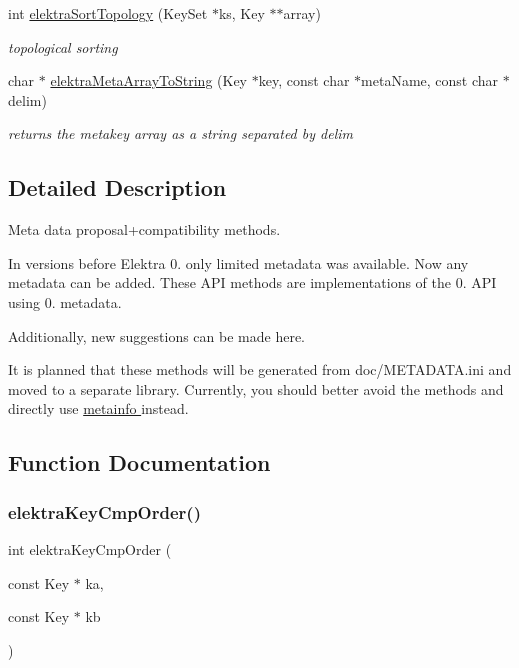 \begin{DoxyCompactItemize}
int \hyperlink{group__meta_gaadfae80314be2415a7654fe8a0d2ee82}{elektra\+Sort\+Topology} (Key\+Set $\ast$ks, Key $\ast$$\ast$array)
\begin{DoxyCompactList}\small\item\em topological sorting \end{DoxyCompactList}\item 
char $\ast$ \hyperlink{group__meta_ga04ceef7845af79a2628a2d4e9217bbb5}{elektra\+Meta\+Array\+To\+String} (Key $\ast$key, const char $\ast$meta\+Name, const char $\ast$delim)
\begin{DoxyCompactList}\small\item\em returns the metakey array as a string separated by delim \end{DoxyCompactList}\end{DoxyCompactItemize}


\subsection{Detailed Description}
Meta data proposal+compatibility methods. 

In versions before Elektra 0. only limited metadata was available. Now any metadata can be added. These A\+PI methods are implementations of the 0. A\+PI using 0. metadata.

Additionally, new suggestions can be made here.

It is planned that these methods will be generated from doc/\+M\+E\+T\+A\+D\+A\+T\+A.\+ini and moved to a separate library. Currently, you should better avoid the methods and directly use \hyperlink{group__keymeta}{metainfo } instead. 

\subsection{Function Documentation}
\mbox{\label{group__meta_gab8b30dfabb0867bd6899e60e7bd193a2}} 
\subsubsection{\texorpdfstring{elektra\+Key\+Cmp\+Order()}{elektraKeyCmpOrder()}}
{\footnotesize\ttfamily int elektra\+Key\+Cmp\+Order (\begin{DoxyParamCaption}\item[{const Key $\ast$}]{ka,  }\item[{const Key $\ast$}]{kb }\end{DoxyParamCaption})}




